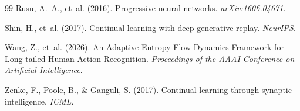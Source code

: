 \documentclass[11pt,a4paper]{article}
\begin{document}
\begin{thebibliography}{99}
Rusu, A.~A., et~al. (2016).
\newblock Progressive neural networks.
\newblock \emph{arXiv:1606.04671}.

Shin, H., et~al. (2017).
\newblock Continual learning with deep generative replay.
\newblock \emph{NeurIPS}.

Wang, Z., et~al. (2026).
\newblock An Adaptive Entropy Flow Dynamics Framework for Long-tailed Human Action Recognition.
\newblock \emph{Proceedings of the AAAI Conference on Artificial Intelligence}.

Zenke, F., Poole, B., \& Ganguli, S. (2017).
\newblock Continual learning through synaptic intelligence.
\newblock \emph{ICML}.

\end{thebibliography}
\end{document}
